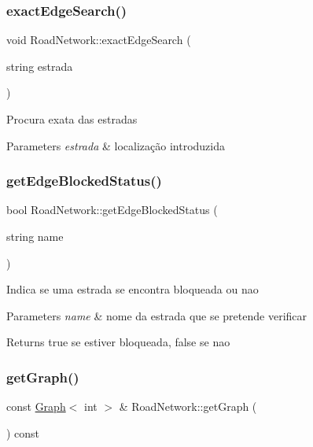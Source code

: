 \subsubsection{\texorpdfstring{exact\+Edge\+Search()}{exactEdgeSearch()}}
{\footnotesize\ttfamily void Road\+Network\+::exact\+Edge\+Search (\begin{DoxyParamCaption}\item[{string}]{estrada }\end{DoxyParamCaption})}

Procura exata das estradas 
\begin{DoxyParams}{Parameters}
{\em estrada} & localização introduzida \\
\hline
\end{DoxyParams}
\mbox{\label{class_road_network_a60e0a20c8e393740c81fa47bc42bf9cd}} 
\subsubsection{\texorpdfstring{get\+Edge\+Blocked\+Status()}{getEdgeBlockedStatus()}}
{\footnotesize\ttfamily bool Road\+Network\+::get\+Edge\+Blocked\+Status (\begin{DoxyParamCaption}\item[{string}]{name }\end{DoxyParamCaption})}

Indica se uma estrada se encontra bloqueada ou nao 
\begin{DoxyParams}{Parameters}
{\em name} & nome da estrada que se pretende verificar \\
\hline
\end{DoxyParams}
\begin{DoxyReturn}{Returns}
true se estiver bloqueada, false se nao 
\end{DoxyReturn}
\mbox{\label{class_road_network_a869771d158ffe75a2d87dd300d54281a}} 
\subsubsection{\texorpdfstring{get\+Graph()}{getGraph()}}
{\footnotesize\ttfamily const \mbox{\hyperlink{class_graph}{Graph}}$<$ int $>$ \& Road\+Network\+::get\+Graph (\begin{DoxyParamCaption}{ }\end{DoxyParamCaption}) const}

